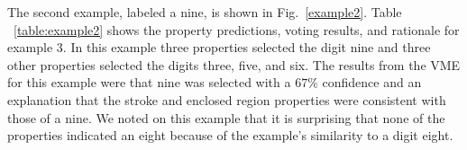 \documentclass[conference]{IEEEtran}
\begin{document}
The second example,  labeled a nine, is shown in Fig.~\ref{example2}.  Table ~\ref{table:example2} shows the property predictions, voting results, and rationale for example 3.  In this example three properties selected the digit nine and three other properties selected the digits three, five, and six.  The results from the VME for this example were that nine was selected with a $67\%$ confidence and an explanation that the stroke and enclosed region properties were consistent with those of a nine.  We noted on this example that it is surprising that none of the properties indicated an eight because of the example's similarity to a digit eight.  

\begin{table}[htbp]
\caption{Probabilistic voting and explainability for Example 2}
\centering
{}
\label{table:example2}
\end{table}
\end{document}
